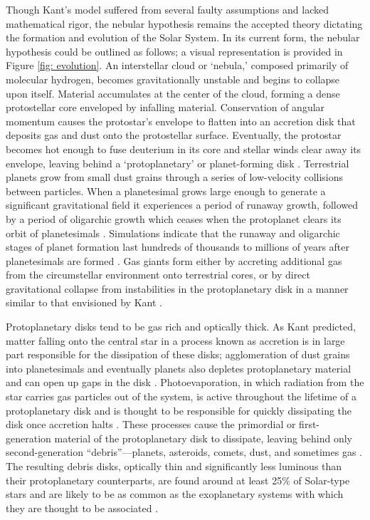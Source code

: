 \documentclass[12pt,oneside]{book}
\begin{document}
Though Kant's model suffered from several faulty assumptions and lacked mathematical rigor, the nebular hypothesis remains the accepted theory dictating the formation and evolution of the Solar System.
In its current form, the nebular hypothesis could be outlined as follows; a visual representation is provided in Figure \ref{fig: evolution}.
An interstellar cloud or `nebula,' composed primarily of molecular hydrogen, becomes gravitationally unstable and begins to collapse upon itself.
Material accumulates at the center of the cloud, forming a dense protostellar core enveloped by infalling material.
Conservation of angular momentum causes the protostar's envelope to flatten into an accretion disk that deposits gas and dust onto the protostellar surface.
Eventually, the protostar becomes hot enough to fuse deuterium in its core and stellar winds clear away its envelope, leaving behind a `protoplanetary' or planet-forming disk \citep{shu87}.
Terrestrial planets grow from small dust grains through a series of low-velocity collisions between particles. 
When a planetesimal grows large enough to generate a significant gravitational field it experiences a period of runaway growth, followed by a period of oligarchic growth which ceases when the protoplanet clears its orbit of planetesimals \citep{chambers_exo}.
Simulations indicate that the runaway and oligarchic stages of planet formation last hundreds of thousands to millions of years after planetesimals are formed \citep{wetherill&stewart93,kokubo00}.
Gas giants form either by accreting additional gas from the circumstellar environment onto terrestrial cores, or by direct gravitational collapse from instabilities in the protoplanetary disk in a manner similar to that envisioned by Kant \citep{d'angelo10}.

Protoplanetary disks tend to be gas rich and optically thick.
As Kant predicted, matter falling onto the central star in a process known as accretion is in large part responsible for the dissipation of these disks; agglomeration of dust grains into planetesimals and eventually planets also depletes protoplanetary material and can open up gaps in the disk \citep{williams&cieza11}.
Photoevaporation, in which radiation from the star carries gas particles out of the system, is active throughout the lifetime of a protoplanetary disk and is thought to be responsible for quickly dissipating the disk once accretion halts \citep{ercolano&pascucci17,clarke01}.
These processes cause the primordial or first-generation material of the protoplanetary disk to dissipate, leaving behind only second-generation ``debris''---planets, asteroids, comets, dust, and sometimes gas \citep{hughes18}.
The resulting debris disks, optically thin and significantly less luminous than their protoplanetary counterparts, are found around at least 25\% of Solar-type stars and are likely to be as common as the exoplanetary systems with which they are thought to be associated \citep{montesinos16}.
\end{document}
